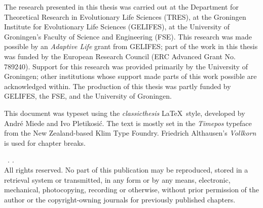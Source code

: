 \thispagestyle{empty}

\hfill

\vfill


\noindent The research presented in this thesis was carried out at the Department for Theoretical Research in Evolutionary Life Sciences (TRES), at the Groningen Institute for Evolutionary Life Sciences (GELIFES), at the University of Groningen's Faculty of Science and Engineering (FSE).
This research was made possible by an \emph{Adaptive Life} grant from GELIFES; part of the work in this thesis was funded by the European Research Council (ERC Advanced Grant No. 789240).
Support for this research was provided primarily by the University of Groningen; other institutions whose support made parts of this work possible are acknowledged within.
The production of this thesis was partly funded by GELIFES, the FSE, and the University of Groningen.

\medskip

\noindent This document was typeset using the \emph{classicthesis} \LaTeX~style, developed by Andr\'e Miede and Ivo Pletikosić.
The text is mostly set in the \emph{Timepos} typeface from the New Zealand-based Klim Type Foundry. Friedrich Althausen's \emph{Vollkorn} is used for chapter breaks.

\bigskip


\noindent\textcopyright~\myName. \textit{\myTitle.}~\the\year{}%
\\
\noindent All rights reserved. No part of this publication may be reproduced, stored in a retrieval system or transmitted, in any form or by any means, electronic, mechanical, photocopying, recording or otherwise, without prior permission of the author or the copyright-owning journals for previously published chapters.
